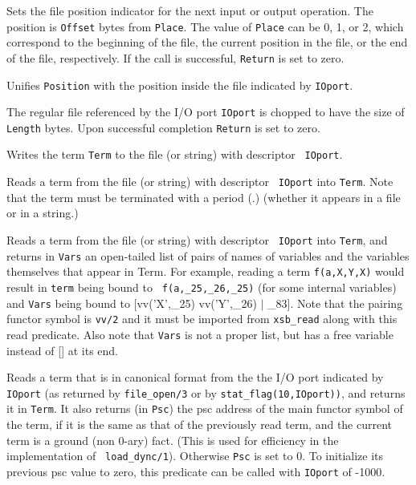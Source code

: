 \begin{description}
    Sets the file position indicator for the next input or output
    operation. The position is {\tt Offset} bytes from {\tt Place}.
    The value of {\tt Place} can be 0, 1, or 2, which correspond to
    the beginning of the file, the current position in the file, or
    the end of the file, respectively. If the call is successful,
    {\tt Return} is set to zero.

    Unifies {\tt Position} with the position inside the file indicated by
    {\tt IOport}.

    The regular file  referenced by the I/O port {\tt IOport}
    is chopped to have the size of {\tt Length} bytes. Upon successful
    completion {\tt Return} is set to zero.

    Writes the term {\tt Term} to the file (or string) with descriptor {\tt
    IOport}.

    Reads a term from the file (or string) with descriptor {\tt
    IOport} into {\tt Term}.  Note that the term must be terminated
    with a period (.) (whether it appears in a file or in a string.)

    Reads a term from the file (or string) with descriptor {\tt
    IOport} into {\tt Term}, and returns in {\tt Vars} an open-tailed list of
    pairs of names of variables and the variables themselves that
    appear in Term.  For example, reading a term {\tt f(a,X,Y,X)}
    would result in {\tt term} being bound to {\tt
    f(a,\_25,\_26,\_25)} (for some internal variables) and {\tt Vars}
    being bound to {[vv('X',\_25) vv('Y',\_26) $\mid$ \_83]}.  Note that the
    pairing functor symbol is {\tt vv/2} and it must be imported from
    {\tt xsb\_read} along with this read predicate.  Also note that 
    {\tt Vars} is not a proper list, but has a free variable instead 
    of [] at its end.

    Reads a term that is in canonical format from the the I/O port
    indicated by {\tt IOport} (as returned by {\tt file\_open/3} or
    by {\tt stat\_flag(10,IOport))}, and returns it in {\tt Term}.
    It also returns (in {\tt Psc}) the psc address of the main functor
    symbol of the term, if it is the same as that of the previously
    read term, and the current term is a ground (non 0-ary) fact.
    (This is used for efficiency in the implementation of {\tt
    load\_dync/1}).  Otherwise {\tt Psc} is set to 0.  To initialize
    its previous psc value to zero, this predicate can be called with
    {\tt IOport} of -1000.


\end{description}
